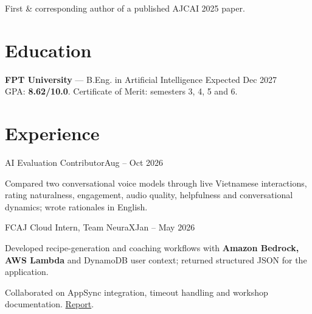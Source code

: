 \documentclass[11pt,a4paper]{article}
\begin{document}
{First \& corresponding author of a published AJCAI 2025 paper.}

\section{Education}
\textbf{FPT University} --- B.Eng. in Artificial Intelligence \hfill Expected Dec 2027\\
GPA: \textbf{8.62/10.0}. Certificate of Merit: semesters 3, 4, 5 and 6.

\section{Experience}
{AI Evaluation Contributor}{Aug -- Oct 2026}
\begin{highlights}
\item Compared two conversational voice models through live Vietnamese interactions, rating naturalness, engagement, audio quality, helpfulness and conversational dynamics; wrote rationales in English.
\end{highlights}
{FCAJ Cloud Intern, Team NeuraX}{Jan -- May 2026}
\begin{highlights}
\item Developed recipe-generation and coaching workflows with \textbf{Amazon Bedrock, AWS Lambda} and DynamoDB user context; returned structured JSON for the application.
\item Collaborated on AppSync integration, timeout handling and workshop documentation. \href{https://hei1sme.github.io/hei-FCAJ-intership-report/}{Report}.
\end{highlights}
\end{document}
